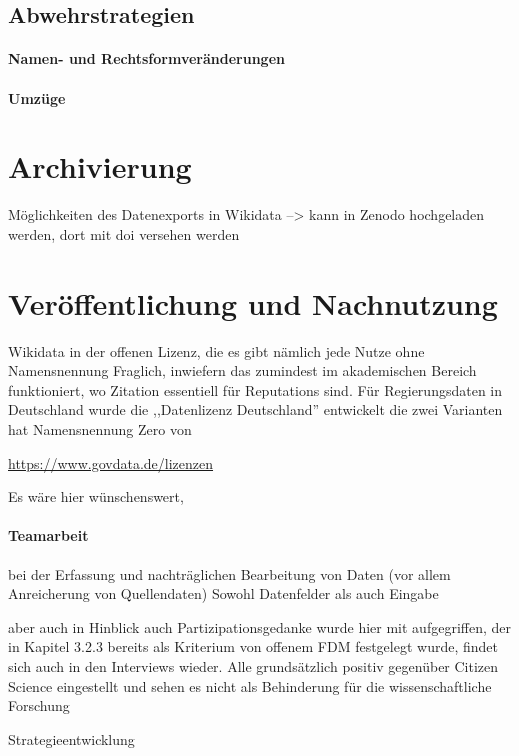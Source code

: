 \paragraph{}
\subsection{Abwehrstrategien}
\paragraph{Namen- und Rechtsformveränderungen}
\paragraph{Umzüge}
\section{Archivierung}
Möglichkeiten des Datenexports in Wikidata --> kann in Zenodo hochgeladen werden, dort mit doi versehen werden
\section{Veröffentlichung und Nachnutzung}

Wikidata in der offenen Lizenz, die es gibt nämlich jede Nutze ohne Namensnennung
Fraglich, inwiefern das zumindest im akademischen Bereich funktioniert, wo Zitation essentiell für Reputations sind.
Für Regierungsdaten in Deutschland wurde die ,,Datenlizenz Deutschland'' entwickelt die zwei Varianten hat
Namensnennung
Zero 
von  

\url{https://www.govdata.de/lizenzen}

Es wäre hier wünschenswert, 

\paragraph{Teamarbeit}
bei der Erfassung und nachträglichen Bearbeitung von Daten (vor allem Anreicherung von Quellendaten)
Sowohl Datenfelder als auch Eingabe

aber auch in Hinblick auch Partizipationsgedanke wurde hier mit aufgegriffen, der in Kapitel 3.2.3 bereits als Kriterium von offenem FDM festgelegt wurde, findet sich auch in den Interviews wieder. Alle grundsätzlich positiv gegenüber Citizen Science eingestellt und sehen es nicht als Behinderung für die wissenschaftliche Forschung 

Strategieentwicklung

